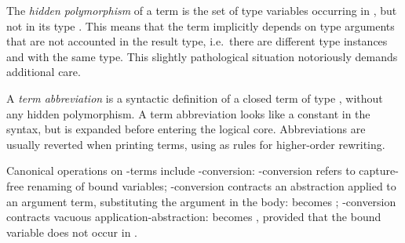 \begin{isabellebody}
\begin{isamarkuptext}
  \medskip The \emph{hidden polymorphism} of a term 
  is the set of type variables occurring in , but not in
  its type \isa{{\isasymsigma}}.  This means that the term implicitly depends
  on type arguments that are not accounted in the result type, i.e.\
  there are different type instances  and
  \isa{t{\isasymvartheta}{\isacharprime}\ {\isacharcolon}{\isacharcolon}\ {\isasymsigma}} with the same type.  This slightly
  pathological situation notoriously demands additional care.

  \medskip A \emph{term abbreviation} is a syntactic definition  of a closed term  of type \isa{{\isasymsigma}},
  without any hidden polymorphism.  A term abbreviation looks like a
  constant in the syntax, but is expanded before entering the logical
  core.  Abbreviations are usually reverted when printing terms, using
  \isa{t\ {\isasymrightarrow}\ c\isactrlisub {\isasymsigma}} as rules for higher-order rewriting.

  \medskip Canonical operations on \isa{{\isasymlambda}}-terms include \isa{{\isasymalpha}{\isasymbeta}{\isasymeta}}-conversion: \isa{{\isasymalpha}}-conversion refers to capture-free
  renaming of bound variables; \isa{{\isasymbeta}}-conversion contracts an
  abstraction applied to an argument term, substituting the argument
  in the body:  becomes ; \isa{{\isasymeta}}-conversion contracts vacuous application-abstraction:  becomes , provided that the bound variable
  does not occur in \isa{f}.


\end{isamarkuptext}
\end{isabellebody}
